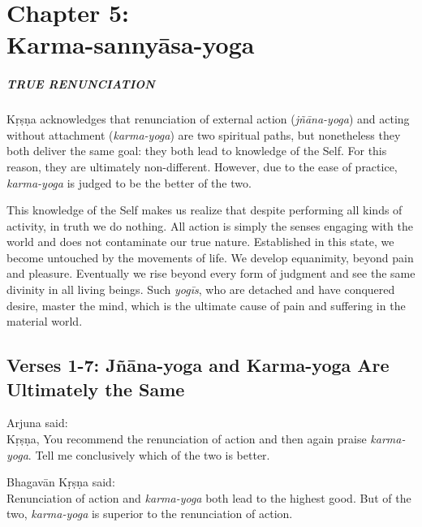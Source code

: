 \chapter{Chapter 5: \\Karma-sannyāsa-yoga}\label{chap-karma-sannyasa-yoga}

\paragraph*{\MakeUppercase{True Renunciation}}


\noindent Kṛṣṇa acknowledges that renunciation of external action (\textit{jñāna-yoga}) and acting without attachment (\textit{karma-yoga}) are two spiritual paths, but nonetheless they both deliver the same goal: they both lead to knowledge of the Self. For this reason, they are ultimately non-different. However, due to the ease of practice, \textit{karma-yoga} is judged to be the better of the two.

This knowledge of the Self makes us realize that despite performing all kinds of activity, in truth we do nothing. All action is simply the senses engaging with the world and does not contaminate our true nature. Established in this state, we become untouched by the movements of life. We develop equanimity, beyond pain and pleasure. Eventually we rise beyond every form of judgment and see the same divinity in all living beings. Such \textit{yogīs}, who are detached and have conquered desire, master the mind, which is the ultimate cause of pain and suffering in the material world.

\section{Verses 1-7: Jñāna-yoga and Karma-yoga Are Ultimately the Same}

{\hspace*{1em}Arjuna said: \\
Kṛṣṇa, You recommend the renunciation of action and then again praise \textit{karma-yoga}. Tell me conclusively which of the two is better.}

{\hspace*{1em}Bhagavān Kṛṣṇa said: \\
Renunciation of action and \textit{karma-yoga} both lead to the highest good. But of the two, \textit{karma-yoga} is superior to the renunciation of action.}

